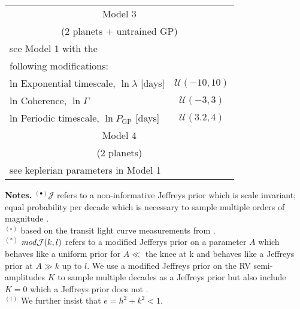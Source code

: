 \begin{table}
\begin{tabular}{lc}
\multicolumn{2}{c}{Model 3} \\
\multicolumn{2}{c}{(2 planets + untrained GP)} \smallskip \\
see Model 1  with the & \\
following modifications: & \\
ln Exponential timescale, $\ln{\lambda}$ [days] & $\mathcal{U}(-10,10)$ \\
ln Coherence, $\ln{\Gamma}$ &  $\mathcal{U}(-3,3)$ \\
ln Periodic timescale, $\ln{P_{\text{GP}}}$ [days] &  $\mathcal{U}(3.2,4)$ \medskip \\

\multicolumn{2}{c}{Model 4} \\
\multicolumn{2}{c}{(2 planets)} \smallskip \\
see keplerian parameters in Model 1 & \\

\hline
\end{tabular}
\begin{list}{}{}
\item {\bf{Notes.}} $^{(\bullet)} \mathcal{J}$ refers to a non-informative Jeffreys prior
  which is scale invariant; equal probability per decade which is necessary to sample
  multiple orders of magnitude \citep{gregory05}. \\
  $^{(\circ)}$ based on the transit light curve measurements from . \\
  $^{(\ast)}$ $\text{\emph{mod}}\mathcal{J}(k,l)$ \mps{} 
  refers to a modified Jefferys prior on a parameter $A$ which behaves like a uniform
  prior for $A \ll$ the knee at k \mps{} and
  behaves like a Jeffreys prior at $A \gg k$ up to $l$. We use a modified Jeffreys prior on 
  the RV semi-amplitudes $K$ to sample multiple decades as a Jeffreys prior but also include
  $K=0$ \mps{} which a Jeffreys prior does not \citep{gregory05}. \\
  $^{(\dagger)}$ We further insist
  that $e = h^2 + k^2 < 1$.
\end{list}
\end{table}
